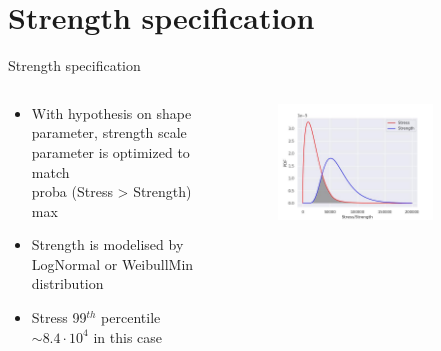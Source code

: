 \documentclass{renault-template}
\begin{document}
\section{Strength specification}
\begin{frame}{Strength specification}
  \begin{center}
  \end{center}
  \begin{columns}
    \begin{column}{0.4\textwidth}
      \begin{itemize}
      \item With hypothesis on shape parameter, strength scale parameter is optimized to match \\ proba (Stress > Strength) max
      \item Strength is modelised by LogNormal or WeibullMin distribution
      \item Stress 99$^{th}$ percentile $\sim 8.4 \cdot 10^4$ in this case
      \end{itemize}
    \end{column}
    \begin{column}{0.6\textwidth}
      \begin{figure}
        \includegraphics[width=0.80\textwidth]{Illustration_StaRe/CR11.0.jpg}
      \end{figure}
    \end{column}
  \end{columns}
\end{frame}
\end{document}
